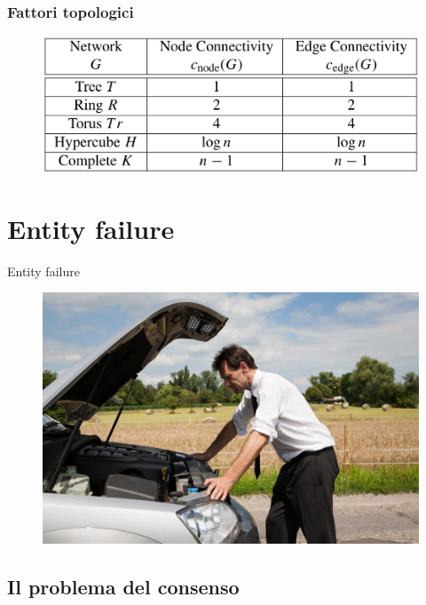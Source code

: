 		\begin{frame}
			\frametitle{Fattori topologici}
			\begin{center}
				\begin{figure}
					\includegraphics[width=\textwidth]{img/connessioni}
				\end{figure}
			\end{center}
		\end{frame}

\section{Entity failure}

	\logo{}

	\begin{frame}
		\begin{center}
			\Huge{Entity failure}
		\end{center}
		\begin{center}
			\begin{figure}
				\includegraphics[width=.7\textwidth]{img/panne}
			\end{figure}
		\end{center}
	\end{frame}

	\subsection{Il problema del consenso}
	
